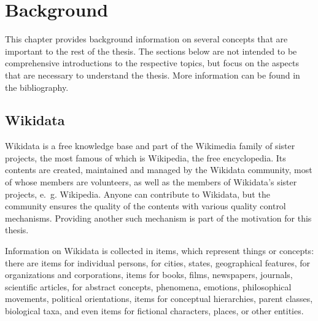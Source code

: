 
\chapter{Background}
\label{ch:Background}


This chapter provides background information
on several concepts that are important to the rest of the thesis.
The sections below are not intended to be comprehensive introductions to the respective topics,
but focus on the aspects that are necessary to understand the thesis.
More information can be found in the bibliography. %

\section{Wikidata}
\label{sec:Background:Wikidata}

\gls{Wikidata} \cite{Vrandecic:2014:WFC:2661061.2629489} %
is a free knowledge base
and part of the \gls{Wikimedia} family of sister projects,
the most famous of which is \gls{Wikipedia}, the free encyclopedia.
Its contents are created, maintained and managed by the \gls{Wikidata} community,
most of whose members are volunteers,
as well as the members of \gls{Wikidata}’s sister projects, e.~g. \gls{Wikipedia}.
Anyone can contribute to \gls{Wikidata},
but the community ensures the quality of the contents with various quality control mechanisms.
Providing another such mechanism is part of the motivation for this thesis. %

Information on \gls{Wikidata} is collected in \glspl{item},
which represent things or concepts:
there are \glspl{item} for individual persons,
for cities, states, geographical features,
for organizations and corporations,
\glspl{item} for books, films, newspapers, journals, scientific articles,
for abstract concepts, phenomena, emotions, philosophical movements, political orientations,
\glspl{item} for conceptual hierarchies, parent classes, biological taxa,
and even \glspl{item} for fictional characters, places, or other entities.

